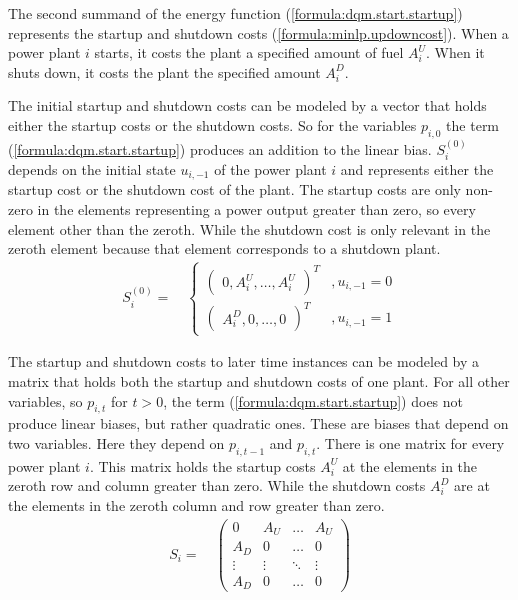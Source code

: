 The second summand of the energy function (\ref{formula:dqm.start.startup}) represents the startup and shutdown costs (\ref{formula:minlp.updowncost}).
When a power plant $i$ starts, it costs the plant a specified amount of fuel $A_i^U$.
When it shuts down, it costs the plant the specified amount $A_i^D$.

The initial startup and shutdown costs can be modeled by a vector that holds either the startup costs or the shutdown costs.
So for the variables $p_{i, 0}$ the term (\ref{formula:dqm.start.startup}) produces an addition to the linear bias.
$S_i^{(0)}$ depends on the initial state $u_{i, -1}$ of the power plant $i$ and represents either the startup cost or the shutdown cost of the plant.
The startup costs are only non-zero in the elements representing a power output greater than zero, so every element other than the zeroth.
While the shutdown cost is only relevant in the zeroth element because that element corresponds to a shutdown plant.
\begin{align}
  S_i^{(0)} = \quad \begin{cases}
    \begin{pmatrix}
      0, A_i^U, \hdots, A_i^U
    \end{pmatrix}^T
    & , u_{i, -1} = 0 \\
    \begin{pmatrix}
      A_i^D, 0, \hdots, 0
    \end{pmatrix}^T
    & , u_{i, -1} = 1
  \end{cases}
\end{align}

The startup and shutdown costs to later time instances can be modeled by a matrix that holds both the startup and shutdown costs of one plant.
For all other variables, so $p_{i, t}$ for $t > 0$, the term (\ref{formula:dqm.start.startup}) does not produce linear biases, but rather quadratic ones.
These are biases that depend on two variables.
Here they depend on $p_{i, t-1}$ and $p_{i, t}$.
There is one matrix for every power plant $i$.
This matrix holds the startup costs $A_i^U$ at the elements in the zeroth row and column greater than zero.
While the shutdown costs $A_i^D$ are at the elements in the zeroth column and row greater than zero.
\begin{align}
  S_i = \quad \begin{pmatrix}
    0   & A_U & \ldots & A_U \\
    A_D &   0 & \ldots &   0 \\
    \vdots & \vdots & \ddots & \vdots \\
    A_D &   0 & \ldots &   0
  \end{pmatrix}
\end{align}


